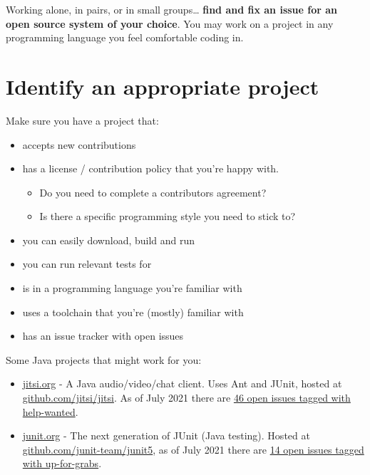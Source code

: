 \documentclass[
]{book}
\providecommand{\tightlist}{%
  \setlength{\itemsep}{0pt}\setlength{\parskip}{0pt}}
\begin{document}
Working alone, in pairs, or in small groups\ldots{} \textbf{find and fix an issue for an open source system of your choice}.
You may work on a project in any programming language you feel comfortable coding in.

\hypertarget{projecti}{%
\section{Identify an appropriate project}\label{projecti}}

Make sure you have a project that:

\begin{itemize}
\tightlist
\item
  accepts new contributions
\item
  has a license / contribution policy that you're happy with.

  \begin{itemize}
  \tightlist
  \item
    Do you need to complete a contributors agreement?
  \item
    Is there a specific programming style you need to stick to?
  \end{itemize}
\item
  you can easily download, build and run
\item
  you can run relevant tests for
\item
  is in a programming language you're familiar with
\item
  uses a toolchain that you're (mostly) familiar with
\item
  has an issue tracker with open issues
\end{itemize}

Some Java projects that might work for you:

\begin{itemize}
\tightlist
\item
  \href{https://jitsi.org\%7D}{jitsi.org} - A Java audio/video/chat client. Uses Ant and JUnit, hosted at \href{https://github.com/jitsi/jitsi}{github.com/jitsi/jitsi}. As of July 2021 there are \href{https://github.com/jitsi/jitsi/labels/help-wanted}{46 open issues tagged with help-wanted}.
\item
  \href{http://junit.org/junit5}{junit.org} - The next generation of JUnit (Java testing). Hosted at \href{https://github.com/junit-team/junit5}{github.com/junit-team/junit5}, as of July 2021 there are \href{https://github.com/junit-team/junit5/labels/up-for-grabs}{14 open issues tagged with up-for-grabs}.
\end{itemize}
\end{document}
